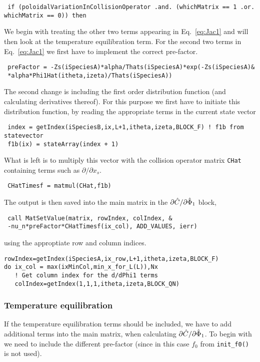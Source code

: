 \documentclass[12pt]{article}
\begin{document}
\begin{lstlisting}
 if (poloidalVariationInCollisionOperator .and. (whichMatrix == 1 .or. whichMatrix == 0)) then
\end{lstlisting}

We begin with treating the other two terms appearing in Eq.~\eqref{eq:Jac1} and will then look at the temperature equilibration term. For the second two terms in Eq.~\eqref{eq:Jac1} we first have to implement the correct pre-factor.

\begin{lstlisting}
 preFactor = -Zs(iSpeciesA)*alpha/Thats(iSpeciesA)*exp(-Zs(iSpeciesA)&
 *alpha*Phi1Hat(itheta,izeta)/Thats(iSpeciesA))\end{lstlisting}

\noindent
The second change is including the first order distribution function (and calculating derivatives thereof). For this purpose we first have to initiate this distribution function, by reading the appropriate terms in the current state vector 

\begin{lstlisting}
 index = getIndex(iSpeciesB,ix,L+1,itheta,izeta,BLOCK_F) ! f1b from statevector
 f1b(ix) = stateArray(index + 1)
\end{lstlisting}
\noindent
What is left is to multiply this vector with the collision operator matrix \texttt{CHat} containing terms such as $\partial/\partial x_s$.

 \begin{lstlisting}
 CHatTimesf = matmul(CHat,f1b)
 \end{lstlisting}
\noindent
The output is then saved into the main matrix in the $\partial \Hat C/\partial \hat \Phi_1$ block,

 \begin{lstlisting}
 call MatSetValue(matrix, rowIndex, colIndex, & 
 -nu_n*preFactor*CHatTimesf(ix_col), ADD_VALUES, ierr) 
\end{lstlisting}
\noindent
using the approptiate row and column indices.

 \begin{lstlisting}
rowIndex=getIndex(iSpeciesA,ix_row,L+1,itheta,izeta,BLOCK_F)
do ix_col = max(ixMinCol,min_x_for_L(L)),Nx
   ! Get column index for the d/dPhi1 terms
   colIndex=getIndex(1,1,1,itheta,izeta,BLOCK_QN)
\end{lstlisting}


\subsubsection*{Temperature equilibration}
\label{sec:Jac2}
If the temperature equilibration terms should be included, we have to add additional terms into the main matrix, when calculating  $\partial \Hat C/\partial \hat \Phi_1$. To begin with we need to include the different pre-factor (since in this case $f_0$ from \texttt{init\_f0()} is not used).
\end{document}
